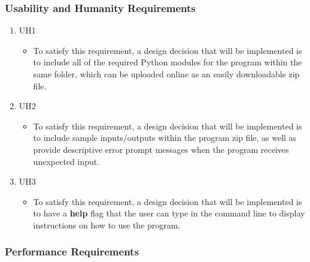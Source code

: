 \documentclass[12pt, titlepage]{article}
\begin{document}
\subsubsection{Usability and Humanity Requirements}

\begin{enumerate}
    \item UH1
    \begin{itemize}
        \item To satisfy this requirement, a design decision that will be implemented 
        is to include all of the required Python modules for the program within the same folder, which can be uploaded online as an easily downloadable zip file.
    \end{itemize}
    \item UH2
    \begin{itemize}
        \item To satisfy this requirement, a design decision that will be implemented is to include sample inputs/outputs within the program zip file, as well as provide descriptive error prompt messages when the program receives unexpected input.
    \end{itemize}
    \item UH3
    \begin{itemize}
        \item To satisfy this requirement, a design decision that will be implemented is to have a \textbf{help} flag that the user can type in the command line to display instructions on how to use the program.
    \end{itemize}
\end{enumerate}

\subsubsection{Performance Requirements}
\end{document}
